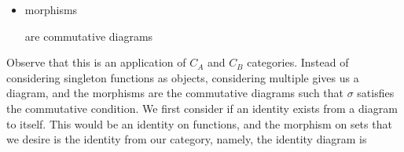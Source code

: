 \documentclass{report}
\begin{document}
\begin{examples}
\begin{example}[\label{exm:1.3.9}]
\begin{itemize}
                \item morphisms
                    \begin{center}
                    \end{center}
                are commutative diagrams
                    \begin{center}
                    \end{center}
            \end{itemize}
            Observe that this is an application of $C_{A}$ and $C_{B}$ categories. Instead of considering singleton functions as objects, considering multiple gives us a diagram, and the morphisms are the commutative diagrams such that $\sigma$ satisfies the commutative condition. We first consider if an identity exists from a diagram to itself. This would be an identity on functions, and the morphism on sets that we desire is the identity from our category, namely, the identity diagram is
            \begin{center}
            \end{center}


\end{example}
\end{examples}
\end{document}
